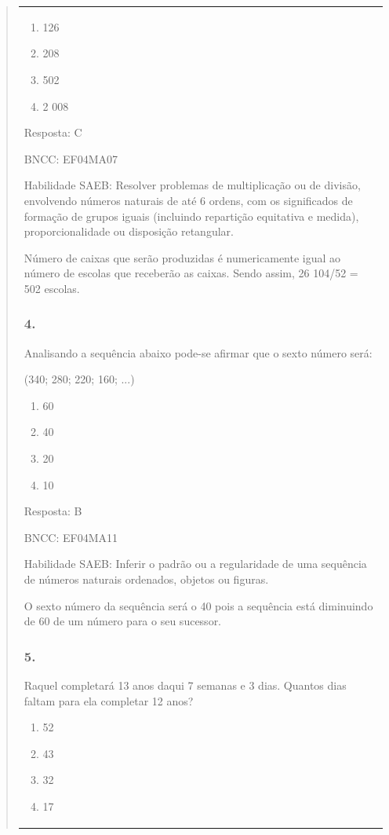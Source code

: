 \begin{enumerate}
\begin{escolha}
\begin{enumerate}
\begin{itemize}
\begin{itemize}
\begin{escolha}
\begin{quote}
\begin{escolha}
{\begin{longtable}[]{@{}l@{}}
\begin{itemize}
\begin{enumerate}
\def\labelenumi{\alph{enumi})}
\item
  126
\item
  208
\item
  502
\item
  2 008
\end{enumerate}

Resposta: C

BNCC: EF04MA07

Habilidade SAEB: Resolver problemas de multiplicação ou de divisão,
envolvendo números naturais de até 6 ordens, com os significados de
formação de grupos iguais (incluindo repartição equitativa e medida),
proporcionalidade ou disposição retangular.

Número de caixas que serão produzidas é numericamente igual ao número de
escolas que receberão as caixas. Sendo assim, 26 104/52 = 502 escolas.

\subsubsection{4. }\label{section-160}

Analisando a sequência abaixo pode-se afirmar que o sexto número será:

(340; 280; 220; 160; ...)

\begin{enumerate}
\def\labelenumi{\alph{enumi})}
\item
  60
\item
  40
\item
  20
\item
  10
\end{enumerate}

Resposta: B

BNCC: EF04MA11

Habilidade SAEB: Inferir o padrão ou a regularidade de uma sequência de
números naturais ordenados, objetos ou figuras.

O sexto número da sequência será o 40 pois a sequência está diminuindo
de 60 de um número para o seu sucessor.

\subsubsection{5.}\label{section-161}

Raquel completará 13 anos daqui 7 semanas e 3 dias. Quantos dias faltam
para ela completar 12 anos?

\begin{enumerate}
\def\labelenumi{\alph{enumi})}
\item
  52
\item
  43
\item
  32
\item
  17
\end{enumerate}


\end{itemize}
\end{longtable}}
\end{escolha}
\end{quote}
\end{escolha}
\end{itemize}
\end{itemize}
\end{enumerate}
\end{escolha}
\end{enumerate}
